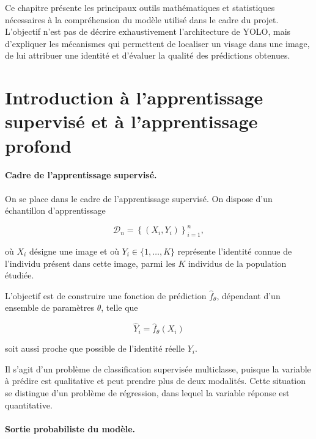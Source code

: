 \documentclass[11pt,a4paper]{report}
\begin{document}
Ce chapitre présente les principaux outils mathématiques et statistiques
nécessaires à la compréhension du modèle utilisé dans le cadre du projet.
L'objectif n'est pas de décrire exhaustivement l'architecture de YOLO, mais
d'expliquer les mécanismes qui permettent de localiser un visage dans une image,
de lui attribuer une identité et d'évaluer la qualité des prédictions obtenues.

\section{Introduction à l'apprentissage supervisé et à l'apprentissage profond}

\paragraph{Cadre de l'apprentissage supervisé.}

On se place dans le cadre de l'apprentissage supervisé. On dispose d'un
échantillon d'apprentissage

\begin{equation}
    \mathcal{D}_n = \left\{(X_i,Y_i)\right\}_{i=1}^{n},
\end{equation}

où $X_i$ désigne une image et où $Y_i \in \{1,\ldots,K\}$ représente
l'identité connue de l'individu présent dans cette image, parmi les $K$
individus de la population étudiée.

L'objectif est de construire une fonction de prédiction
$\widehat{f}_{\theta}$, dépendant d'un ensemble de paramètres $\theta$, telle que

\begin{equation}
    \widehat{Y}_i = \widehat{f}_{\theta}(X_i)
\end{equation}

soit aussi proche que possible de l'identité réelle $Y_i$.

Il s'agit d'un problème de classification supervisée multiclasse, puisque la
variable à prédire est qualitative et peut prendre plus de deux modalités.
Cette situation se distingue d'un problème de régression, dans lequel la
variable réponse est quantitative.

\paragraph{Sortie probabiliste du modèle.}
\end{document}
